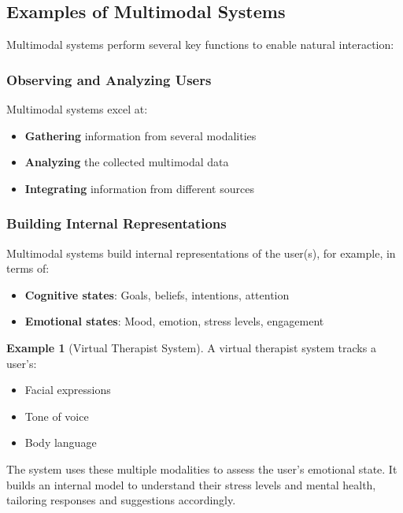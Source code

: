 \documentclass[11pt,a4paper]{article}
\theoremstyle{definition}
\newtheorem{example}{Example}[section]
\theoremstyle{plain}
\theoremstyle{remark}
\begin{document}
\subsection{Examples of Multimodal Systems}

Multimodal systems perform several key functions to enable natural interaction:

\subsubsection{Observing and Analyzing Users}

Multimodal systems excel at:

\begin{itemize}
    \item \textbf{Gathering} information from several modalities
    \item \textbf{Analyzing} the collected multimodal data
    \item \textbf{Integrating} information from different sources
\end{itemize}

\subsubsection{Building Internal Representations}

Multimodal systems build internal representations of the user(s), for example, in terms of:

\begin{itemize}
    \item \textbf{Cognitive states}: Goals, beliefs, intentions, attention
    \item \textbf{Emotional states}: Mood, emotion, stress levels, engagement
\end{itemize}

\begin{example}[Virtual Therapist System]
A virtual therapist system tracks a user's:
\begin{itemize}
    \item Facial expressions
    \item Tone of voice
    \item Body language
\end{itemize}

The system uses these multiple modalities to assess the user's emotional state. It builds an internal model to understand their stress levels and mental health, tailoring responses and suggestions accordingly.
\end{example}
\end{document}
